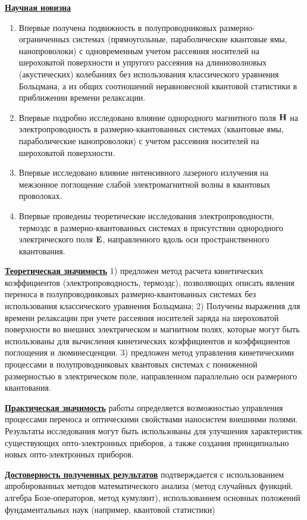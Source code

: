 \underline{\textbf{Научная новизна}}
\begin{enumerate}
	\item Впервые получена подвижность в полупроводниковых размерно-ограниченных системах (прямоугольные, параболические квантовые ямы, нанопроволоки) с одновременным учетом рассеяния носителей на шероховатой поверхности и упругого рассеяния на длинноволновых (акустических) колебаниях без использования классического уравнения Больцмана, а из общих соотношений неравновесной квантовой статистики в приближении времени релаксации.
	\item Впервые подробно исследовано влияние однородного магнитного поля $\boldsymbol{\mathbf{H}}$ на электропроводность в размерно-квантованных системах (квантовые ямы, параболические нанопроволоки) с учетом рассеяния носителей на шероховатой поверхности.
	\item Впервые исследовано влияние интенсивного лазерного излучения на межзонное поглощение слабой электромагнитной волны в квантовых проволоках. 
	\item Впервые проведены теоретические исследования электропроводности, термоэдс в размерно-квантованных системах в присутствии однородного электрического поля $\boldsymbol{\mathbf{E}}$, направленного вдоль оси пространственного квантования.
\end{enumerate}

\underline{\textbf{Теоретическая значимость}} 1) предложен метод расчета кинетических коэффициентов (электропроводность, термоэдс), позволяющих описать явления переноса в полупроводниковых размерно-квантованных системах без использования классического уравнения Больцмана;  2) Получены выражения для времени релаксации при учете рассеяния носителей заряда на шероховатой поверхности во внешних электрическом и магнитном полях, которые могут быть использованы для вычисления кинетических коэффициентов и коэффициентов поглощения и люминесценции. 3) предложен метод управления кинетическими процессами в полупроводниковых квантовых системах с пониженной размерностью в электрическом поле, направленном параллельно оси размерного квантования. 

\underline{\textbf{Практическая значимость}} работы определяется возможностью управления процессами переноса и оптическими свойствами наносистем внешними полями. Результаты исследования могут быть использованы для улучшения характеристик существующих опто-электронных приборов, а также создания принципиально новых опто-электронных приборов.

\underline{\textbf{Достоверность полученных результатов}} подтверждается с использованием апробированных методов математического анализа (метод случайных функций. алгебра Бозе-операторов, метод кумулянт), использованием основных положений фундаментальных наук (например, квантовой статистики)

